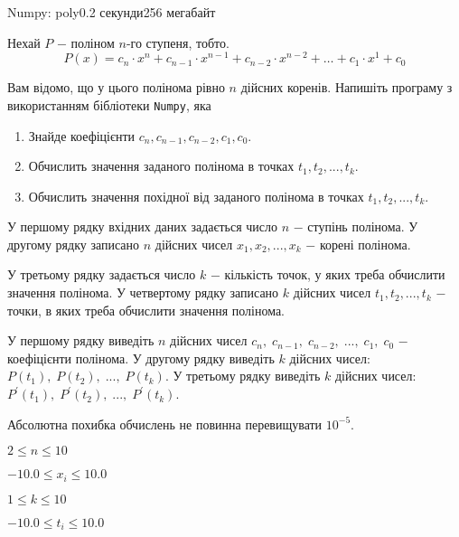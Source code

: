 \begin{problem}{Numpy: poly}{}{}{0.2 секунди}{256 мегабайт}


Нехай $P$ $-$ поліном $n$-го ступеня, тобто.
$$
  P(x) = c_n \cdot x^n + c_{n-1} \cdot x^{n-1} + c_{n-2} \cdot x^{n-2} + \dots + c_{1} \cdot x^{1} + c_{0} 
$$


Вам відомо, що у цього полінома рівно $n$ дійсних коренів.
Напишіть програму з використанням бібліотеки \texttt{Numpy}, яка
\begin{enumerate}
 \item Знайде коефіцієнти $c_n, c_{n-1}, c_{n-2}, c_{1}, c_{0}$.
 \item Обчислить значення заданого полінома в точках $t_1, t_2, ..., t_k$.
 \item Обчислить значення похідної від заданого полінома в точках $t_1, t_2, ..., t_k$.
\end{enumerate}




\InputFile
У першому рядку вхідних даних задається число $n$ $-$ ступінь полінома.
У другому рядку записано $n$ дійсних чисел $x_1, x_2, ..., x_k$ $-$ корені полінома.


У третьому рядку задається число $k$ $-$ кількість точок, у яких треба обчислити значення полінома.
У четвертому рядку записано $k$ дійсних чисел $t_1, t_2, ..., t_k$ $-$ точки, в яких треба обчислити значення полінома.


\OutputFile
У першому рядку виведіть $n$ дійсних чисел $c_n,\; c_{n-1}, \; c_{n-2}, \; ..., \; c_{1}, \; c_{0}$ $-$ коефіцієнти полінома.
У другому рядку виведіть $k$ дійсних чисел: $P(t_1), \; P(t_2),\; ...,\; P(t_k)$.
У третьому рядку виведіть $k$ дійсних чисел: $P^\prime(t_1),\; P^\prime(t_2),\; ..., \; P^\prime(t_k)$.


Абсолютна похибка обчислень не повинна перевищувати $10^{-5}$.


\Constraints
$2 \le n \le 10$

$-10.0 \le x_i \le 10.0$

$1 \le k \le 10$

$-10.0 \le t_i \le 10.0$

\Examples
\begin{example}
%
%
\end{example}

\end{problem}

